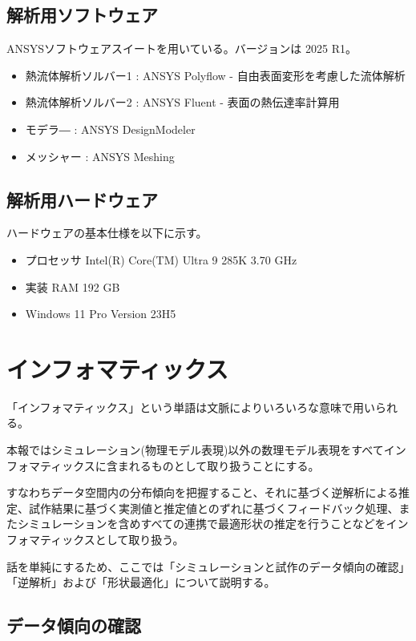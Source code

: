 \documentclass[report]{jlreq}
\begin{document}
\subsection{解析用ソフトウェア}
ANSYSソフトウェアスイートを用いている。バージョンは 2025 R1。
\begin{itemize}
  \item 熱流体解析ソルバー1 : ANSYS Polyflow - 自由表面変形を考慮した流体解析
  \item 熱流体解析ソルバー2 : ANSYS Fluent - 表面の熱伝達率計算用
  \item モデラ― : ANSYS DesignModeler
  \item メッシャー : ANSYS Meshing
\end{itemize}



\subsection{解析用ハードウェア}
ハードウェアの基本仕様を以下に示す。

\begin{itemize}
  \item プロセッサ	Intel(R) Core(TM) Ultra 9 285K   3.70 GHz
  \item 実装 RAM	192 GB
  \item Windows 11 Pro Version 23H5
\end{itemize}



\section{インフォマティックス}
「インフォマティックス」という単語は文脈によりいろいろな意味で用いられる。

本報ではシミュレーション({\small 物理モデル表現})以外の数理モデル表現をすべてインフォマティックスに含まれるものとして取り扱うことにする。

すなわちデータ空間内の分布傾向を把握すること、それに基づく逆解析による推定、試作結果に基づく実測値と推定値とのずれに基づくフィードバック処理、またシミュレーションを含めすべての連携で最適形状の推定を行うことなどをインフォマティックスとして取り扱う。

話を単純にするため、ここでは「シミュレーションと試作のデータ傾向の確認」「逆解析」および「形状最適化」について説明する。

\subsection{データ傾向の確認}
\end{document}
